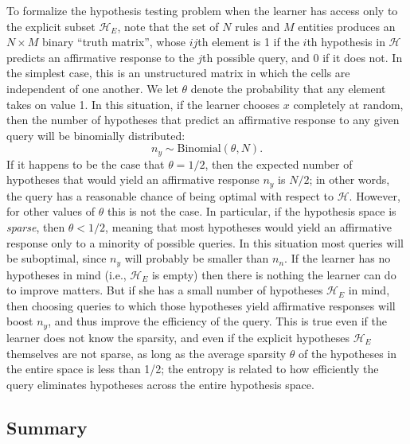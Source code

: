 \documentclass{apa}
\newcommand{\ruleset}{\mathcal{H}}
\begin{document}
To formalize the hypothesis testing problem when the learner has access only to the explicit subset $\ruleset_E$, note that the set of $N$ rules and $M$ entities produces an $N \times M$ binary ``truth matrix'', whose $ij$th element is 1 if the $i$th hypothesis in $\mathcal{H}$ predicts an affirmative response to the $j$th possible query, and 0 if it does not. In the simplest case, this is an unstructured matrix in which the cells are independent of one another. We let $\theta$ denote the probability that any element takes on value 1. In this situation, if the learner chooses $x$ completely at random, then the number of hypotheses that predict an affirmative response to any given query will be binomially distributed:
\begin{equation}
n_y \sim \mbox{Binomial}(\theta,N).
\end{equation}
If it happens to be the case that $\theta=1/2$, then the expected number of hypotheses that would yield an affirmative response $n_y$ is $N/2$; in other words, the query has a reasonable chance of being optimal with respect to $\mathcal{H}$. However, for other values of $\theta$ this is not the case. In particular, if the hypothesis space is {\it sparse}, then $\theta < 1/2$, meaning that most hypotheses would yield an affirmative response only to a minority of possible queries.  In this situation most queries will be suboptimal, since $n_y$ will probably be smaller than $n_n$. If the learner has no hypotheses in mind (i.e., $\mathcal{H}_E$ is empty) then there is nothing the learner can do to improve matters.  But if she has a small number of hypotheses $\mathcal{H}_E$ in mind, then choosing queries to which those hypotheses yield affirmative responses will boost $n_y$, and thus improve the efficiency of the query.  This is true even if the learner does not know the sparsity, and even if the explicit hypotheses $\mathcal{H}_E$ themselves are not sparse, as long as the average sparsity $\theta$ of the hypotheses in the entire space is less than 1/2; the entropy is related to how efficiently the query eliminates hypotheses across the entire hypothesis space.

\subsection{Summary}
\end{document}
